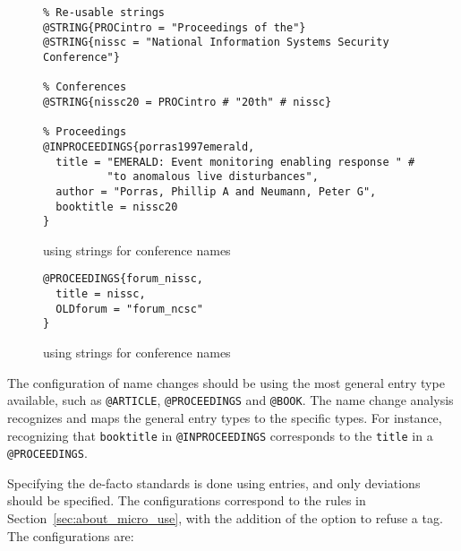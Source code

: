 \begin{figure}
  \centering
\begin{small}
\begin{verbatim}
% Re-usable strings
@STRING{PROCintro = "Proceedings of the"}
@STRING{nissc = "National Information Systems Security Conference"}

% Conferences
@STRING{nissc20 = PROCintro # "20th" # nissc}

% Proceedings
@INPROCEEDINGS{porras1997emerald,
  title = "EMERALD: Event monitoring enabling response " #
          "to anomalous live disturbances",
  author = "Porras, Phillip A and Neumann, Peter G",
  booktitle = nissc20
}
\end{verbatim}
\end{small}
  \caption{ using strings for conference names}
  \label{fig:analyzing_configuration_name_change_bib_file_strings}
\end{figure}

\begin{figure}
  \centering
\begin{verbatim}
@PROCEEDINGS{forum_nissc,
  title = nissc,
  OLDforum = "forum_ncsc"
}
\end{verbatim}
  \caption{ using strings for conference names}
  \label{fig:analyzing_configuration_name_change_config_file_strings}
\end{figure}


The configuration of name changes should be using the most general
entry type available, such as \texttt{@ARTICLE}, \texttt{@PROCEEDINGS}
and \texttt{@BOOK}.  The name change analysis recognizes and maps the
general entry types to the specific types.  For instance, recognizing
that \texttt{booktitle} in \texttt{@INPROCEEDINGS} corresponds to the
\texttt{title} in a \texttt{@PROCEEDINGS}.

Specifying the de-facto standards is done using {\bibtex} entries, and
only deviations should be specified.  The configurations correspond to
the rules in Section~\ref{sec:about_micro_use}, with the addition of
the option to refuse a tag.  The configurations are:

